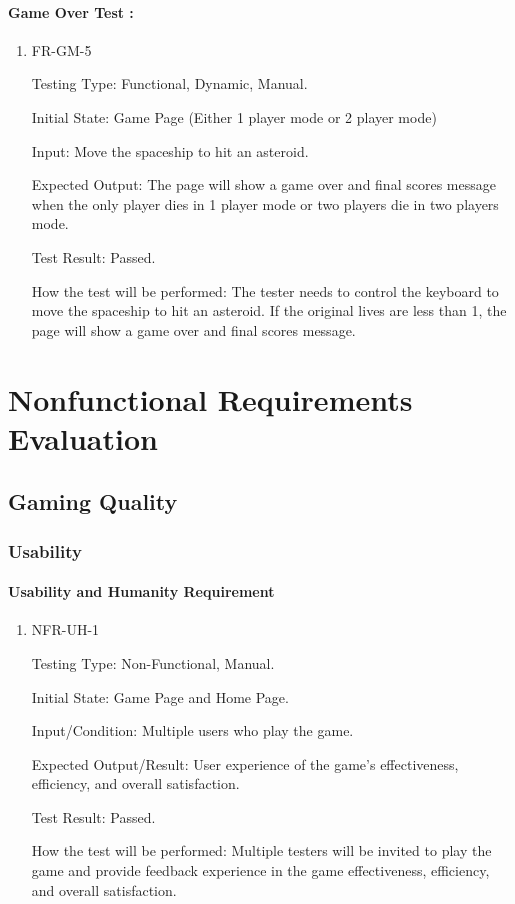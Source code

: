 \documentclass[12pt, titlepage]{article}
\begin{document}
\paragraph{Game Over Test :}
\begin{enumerate}					
\item{FR-GM-5\\}

Testing Type: Functional, Dynamic, Manual.  

Initial State: Game Page (Either 1 player mode or 2 player mode)

Input: Move the spaceship to hit an asteroid.

Expected Output: The page will show a game over and final scores message when the only player dies in 1 player mode or two players die in two players mode.

Test Result: Passed.

How the test will be performed: The tester needs to control the keyboard to move the spaceship to hit an asteroid. If the original lives are less than 1, the page will show a game over and final scores message.
\\
\end{enumerate}

\section{Nonfunctional Requirements Evaluation}

\subsection{Gaming Quality}

\subsubsection{Usability}
\paragraph{Usability and Humanity Requirement}

\begin{enumerate}

\item{NFR-UH-1\\}

Testing Type: Non-Functional, Manual.  

Initial State: Game Page and Home Page.

Input/Condition: Multiple users who play the game.

Expected Output/Result: User experience of the game’s effectiveness, efficiency, and overall satisfaction.

Test Result: Passed.

How the test will be performed: Multiple testers will be invited to play the game and provide feedback experience in the game effectiveness, efficiency, and overall satisfaction.

\end{enumerate}
\end{document}
